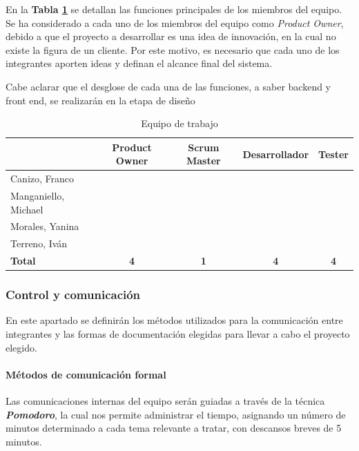 En la \textbf{Tabla \ref{equipoDeTrabajo}} se detallan las funciones principales de los miembros del equipo.
Se ha considerado a cada uno de los miembros del equipo como \textit{Product Owner}, debido a que el proyecto a desarrollar es una idea de innovación, en la cual no existe la figura de un cliente.
Por este motivo, es necesario que cada uno de los integrantes aporten ideas y definan el alcance final del sistema.

Cabe aclarar que el desglose de cada una de las funciones, a saber backend y front end, se realizarán en la etapa de diseño


\begin{table}[h]
\begin{center}
\begin{tabular}{|l|c|c|c|c|}
	\hline                      & Product Owner & Scrum Master & Desarrollador & Tester     \\
	\hline Canizo, Franco       & \checkmark    &              & \checkmark    & \checkmark \\
	\hline Manganiello, Michael & \checkmark    & \checkmark   & \checkmark    & \checkmark \\
	\hline Morales, Yanina      & \checkmark    &              & \checkmark    & \checkmark \\
	\hline Terreno, Iván        & \checkmark    &              & \checkmark    & \checkmark \\
	\hline \textbf{Total}       & \textbf{4}    & \textbf{1}   & \textbf{4}    & \textbf{4} \\
\hline
\end{tabular}
\caption{Equipo de trabajo}
\label{equipoDeTrabajo}
\end{center}
\end{table}


\subsubsection{Control y comunicación}
En este apartado se definirán los métodos utilizados para la comunicación entre integrantes y las formas de documentación elegidas para llevar a cabo el proyecto elegido.


\paragraph{Métodos de comunicación formal}

Las comunicaciones internas del equipo serán guiadas a través de la técnica \textbf{\textit{Pomodoro}}, la cual nos permite administrar el tiempo, asignando un número de minutos determinado a cada tema relevante a tratar, con descansos breves de 5 minutos.

